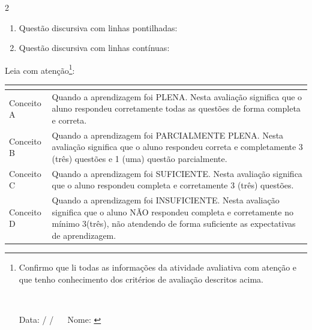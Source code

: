 \documentclass[a4paper,11pt]{article}
\begin{document}
\begin{multicols}{2}
\begin{enumerate}
\item Questão discursiva com linhas pontilhadas:

\dotfill

\dotfill

\dotfill

\dotfill

\item Questão discursiva com linhas contínuas:

\hrulefill

\hrulefill

\hrulefill

\hrulefill

\end{enumerate}

\end{multicols}

\newpage %

Leia com atenção\footnote{Confirmo que li todas as informações da atividade avaliativa com atenção e que tenho conhecimento dos critérios de avaliação descritos acima.

\

Data: \underline{\hspace{0.7cm}} / \underline{\hspace{0.7cm}} / \underline{\hspace{0.7cm}} $\quad$ Nome: \underline{\hspace{11cm}}}:

\begin{center}
    \begin{tabular}{ | l | p{15cm} |}
\multicolumn{2}{l}{}\\    
\hline
Conceito A &  Quando 	a aprendizagem foi PLENA. Nesta avaliação significa que o aluno respondeu corretamente todas as questões de forma completa e correta.\\
\hline
Conceito B & Quando 	a aprendizagem foi PARCIALMENTE PLENA. Nesta avaliação significa que o aluno respondeu correta e completamente 3 (três) questões e 1 (uma) questão parcialmente.\\
\hline
Conceito C     &  Quando 	a aprendizagem foi SUFICIENTE. Nesta avaliação significa que o aluno respondeu completa e corretamente 3 (três) questões.\\
\hline
Conceito D     & Quando 	a aprendizagem foi INSUFICIENTE. Nesta avaliação significa que o aluno NÃO 	respondeu completa e corretamente no mínimo 3(três), não atendendo de forma suficiente as expectativas de aprendizagem. \\
    \hline
    \end{tabular}
\end{center}
\end{document}
